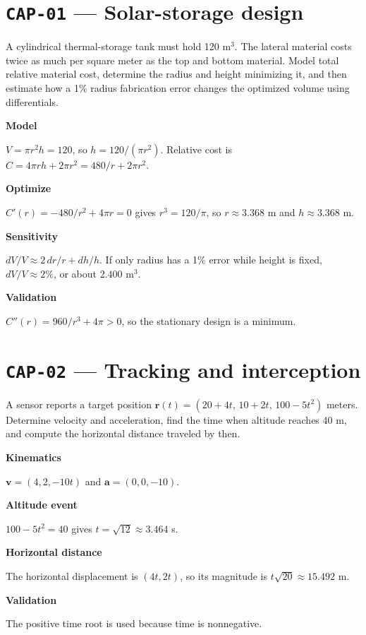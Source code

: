 \documentclass[11pt]{book}
\newcommand{\pid}[1]{\texttt{#1}}
\begin{document}
\section*{\pid{CAP-01} — Solar-storage design}
\begin{problembox}A cylindrical thermal-storage tank must hold 120 m$^3$. The lateral material costs twice as much per square meter as the top and bottom material. Model total relative material cost, determine the radius and height minimizing it, and then estimate how a 1\% radius fabrication error changes the optimized volume using differentials.\end{problembox}
\begin{solutionbox}
\textbf{Model}\par $V=\pi r^2h=120$, so $h=120/(\pi r^2)$. Relative cost is $C=4\pi rh+2\pi r^2=480/r+2\pi r^2$.\par\medskip
\textbf{Optimize}\par $C'(r)=-480/r^2+4\pi r=0$ gives $r^3=120/\pi$, so $r\approx 3.368$ m and $h\approx 3.368$ m.\par\medskip
\textbf{Sensitivity}\par $dV/V\approx2\,dr/r+dh/h$. If only radius has a 1\% error while height is fixed, $dV/V\approx2\%$, or about $2.400$ m$^3$.\par\medskip
\textbf{Validation}\par $C''(r)=960/r^3+4\pi>0$, so the stationary design is a minimum.\par\medskip
\end{solutionbox}
\section*{\pid{CAP-02} — Tracking and interception}
\begin{problembox}A sensor reports a target position $\mathbf r(t)=(20+4t,\,10+2t,\,100-5t^2)$ meters. Determine velocity and acceleration, find the time when altitude reaches 40 m, and compute the horizontal distance traveled by then.\end{problembox}
\begin{solutionbox}
\textbf{Kinematics}\par $\mathbf v=(4,2,-10t)$ and $\mathbf a=(0,0,-10)$.\par\medskip
\textbf{Altitude event}\par $100-5t^2=40$ gives $t=\sqrt{12}\approx 3.464$ s.\par\medskip
\textbf{Horizontal distance}\par The horizontal displacement is $(4t,2t)$, so its magnitude is $t\sqrt{20}\approx 15.492$ m.\par\medskip
\textbf{Validation}\par The positive time root is used because time is nonnegative.\par\medskip
\end{solutionbox}
\end{document}
